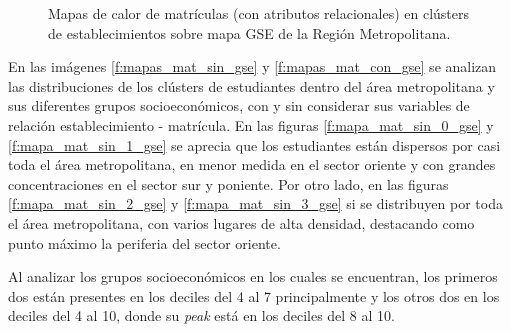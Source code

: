 \begin{figure}[H]
 \caption{Mapas de calor de matrículas (con atributos relacionales) en clústers de establecimientos sobre mapa GSE de la Región Metropolitana.}
 \label{f:mapas_mat_en_estab_con_gse}
\end{figure}

En las imágenes \ref{f:mapas_mat_sin_gse} y \ref{f:mapas_mat_con_gse} se analizan las distribuciones de los clústers de estudiantes dentro del área metropolitana y sus diferentes grupos socioeconómicos, con y sin considerar sus variables de relación establecimiento - matrícula. En las figuras \ref{f:mapa_mat_sin_0_gse} y \ref{f:mapa_mat_sin_1_gse} se aprecia que los estudiantes están dispersos por casi toda el área metropolitana, en menor medida en el sector oriente y con grandes concentraciones en el sector sur y poniente. Por otro lado, en las figuras \ref{f:mapa_mat_sin_2_gse} y \ref{f:mapa_mat_sin_3_gse} si se distribuyen por toda el área metropolitana, con varios lugares de alta densidad, destacando como punto máximo la periferia del sector oriente.

Al analizar los grupos socioeconómicos en los cuales se encuentran, los primeros dos están presentes en los deciles del 4 al 7 principalmente y los otros dos en los deciles del 4 al 10, donde su \textit{peak} está en los deciles del 8 al 10.



